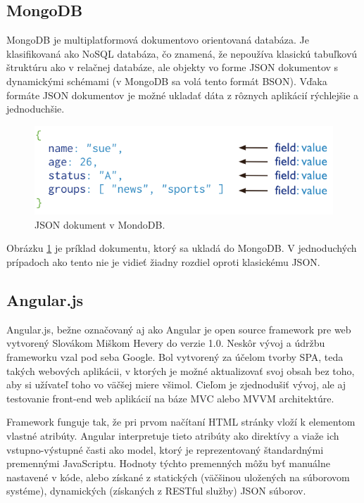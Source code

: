 \subsection{MongoDB}
MongoDB je multiplatformová dokumentovo orientovaná databáza. Je klasifikovaná ako NoSQL databáza, čo znamená, že nepoužíva klasickú tabuľkovú štruktúru ako v relačnej databáze, ale objekty vo forme JSON dokumentov s dynamickými schémami (v MongoDB sa volá tento formát BSON). Vďaka formáte JSON dokumentov je možné ukladať dáta z rôznych aplikácií rýchlejšie a jednoduchšie.\cite{mongodb-wiki}

\begin{figure}[H]
  \centering
  \includegraphics[scale=0.7]{img/mongodb/crud-annotated-document.png}
  \caption{JSON dokument v MondoDB.}
  \label{mongodb-example}
\end{figure}

Obrázku \ref{mongodb-example} je príklad dokumentu, ktorý sa ukladá do MongoDB. V jednoduchých prípadoch ako tento nie je vidieť žiadny rozdiel oproti klasickému JSON.

\subsection{Angular.js}
Angular.js, bežne označovaný aj ako Angular je open source framework pre web vytvorený Slovákom Miškom Hevery do verzie 1.0. Neskôr vývoj a údržbu frameworku vzal pod seba Google. Bol vytvorený za účelom tvorby SPA, teda takých webových aplikácii, v ktorých je možné aktualizovať svoj obsah bez toho, aby si užívateľ toho vo väčšej miere všimol. Cieľom je zjednodušiť vývoj, ale aj testovanie front-end web aplikácií na báze MVC alebo MVVM architektúre.

Framework funguje tak, že pri prvom načítaní HTML stránky vloží k elementom vlastné atribúty. Angular interpretuje tieto atribúty ako direktívy a viaže ich vstupno-výstupné časti ako model, ktorý je reprezentovaný štandardnými premennými JavaScriptu. Hodnoty týchto premenných môžu byť manuálne nastavené v kóde, alebo získané z statických (väčšinou uložených na súborovom systéme), dynamických (získaných z RESTful služby) JSON súborov.

